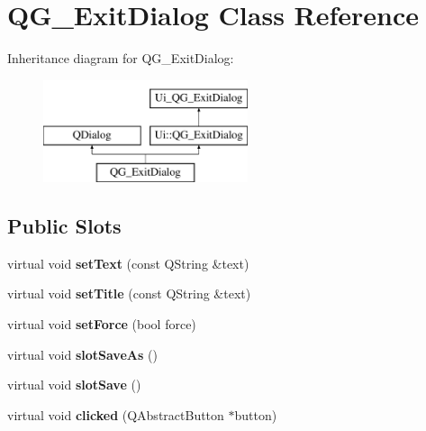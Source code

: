 \hypertarget{classQG__ExitDialog}{\section{Q\-G\-\_\-\-Exit\-Dialog Class Reference}
\label{classQG__ExitDialog}
}
Inheritance diagram for Q\-G\-\_\-\-Exit\-Dialog\-:\begin{figure}[H]
\begin{center}
\leavevmode
\includegraphics[height=3.000000cm]{classQG__ExitDialog}
\end{center}
\end{figure}
\subsection*{Public Slots}
\begin{DoxyCompactItemize}
\item 
\hypertarget{classQG__ExitDialog_a3edf6766026f3d737cf668391fd4028e}{virtual void {\bfseries set\-Text} (const Q\-String \&text)}\label{classQG__ExitDialog_a3edf6766026f3d737cf668391fd4028e}

\item 
\hypertarget{classQG__ExitDialog_a50060e93ff1cbdc29f7181b7948b64d5}{virtual void {\bfseries set\-Title} (const Q\-String \&text)}\label{classQG__ExitDialog_a50060e93ff1cbdc29f7181b7948b64d5}

\item 
\hypertarget{classQG__ExitDialog_acf1593ca92351a585213e7edf7d0d8fe}{virtual void {\bfseries set\-Force} (bool force)}\label{classQG__ExitDialog_acf1593ca92351a585213e7edf7d0d8fe}

\item 
\hypertarget{classQG__ExitDialog_ad5f921dc9f5d06fe41b8d38f863e5732}{virtual void {\bfseries slot\-Save\-As} ()}\label{classQG__ExitDialog_ad5f921dc9f5d06fe41b8d38f863e5732}

\item 
\hypertarget{classQG__ExitDialog_ade1923bc7a54ead6257a6c4f32e6720c}{virtual void {\bfseries slot\-Save} ()}\label{classQG__ExitDialog_ade1923bc7a54ead6257a6c4f32e6720c}

\item 
\hypertarget{classQG__ExitDialog_a0adf55a2d7e346ccb0f8c4524212b02d}{virtual void {\bfseries clicked} (Q\-Abstract\-Button $\ast$button)}\label{classQG__ExitDialog_a0adf55a2d7e346ccb0f8c4524212b02d}

\end{DoxyCompactItemize}
